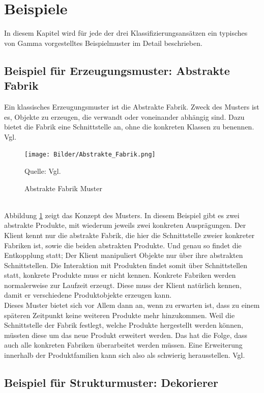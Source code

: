 \documentclass[fontsize=11pt,a4paper,final]{scrreprt}[2003/01/01]
\newcommand*{\quelle}{%
	\footnotesize Quelle: 
}
\begin{document}
\section{Beispiele}
In diesem Kapitel wird für jede der drei Klassifizierungsansätzen ein typisches von Gamma vorgestelltes Beispielmuster im Detail beschrieben.

\subsection{Beispiel für Erzeugungsmuster: Abstrakte Fabrik}

Ein klassisches Erzeugungsmuster ist die Abstrakte Fabrik. Zweck des Musters ist es, Objekte zu erzeugen, die verwandt oder voneinander abhängig sind. Dazu bietet die Fabrik eine Schnittstelle an, ohne die konkreten Klassen zu benennen. Vgl. \cite[S. 107]{gamma2004}

\begin{figure}[H]
	\centering
	\texttt{[image: Bilder/Abstrakte\_Fabrik.png]}
	\caption{Abstrakte Fabrik Muster}
	\quelle{ Vgl. \cite[S. 109]{gamma2004}}
	\label{fig:Abstrakte_Fabrik}
\end{figure}
\ \\
Abbildung \ref{fig:Abstrakte_Fabrik} zeigt das Konzept des Musters. In diesem Beispiel gibt es zwei abstrakte Produkte, mit wiederum jeweils zwei konkreten Ausprägungen. Der Klient kennt nur die abstrakte Fabrik, die hier die Schnittstelle zweier konkreter Fabriken ist, sowie die beiden abstrakten Produkte. Und genau so findet die Entkopplung statt; Der Klient manipuliert Objekte nur über ihre abstrakten Schnittstellen. Die Interaktion mit Produkten findet somit über Schnittstellen statt, konkrete Produkte muss er nicht kennen. Konkrete Fabriken werden normalerweise zur Laufzeit erzeugt. Diese muss der Klient natürlich kennen, damit er verschiedene Produktobjekte erzeugen kann. \\
Dieses Muster bietet sich vor Allem dann an, wenn zu erwarten ist, dass zu einem späteren Zeitpunkt keine weiteren Produkte mehr hinzukommen. Weil die Schnittstelle der Fabrik festlegt, welche Produkte hergestellt werden können, müssten diese um das neue Produkt erweitert werden. Das hat die Folge, dass auch alle konkreten Fabriken überarbeitet werden müssen. Eine Erweiterung innerhalb der Produktfamilien kann sich also als schwierig herausstellen. Vgl. \cite[S. 109-111]{gamma2004}

\subsection{Beispiel für Strukturmuster: Dekorierer}
\end{document}
